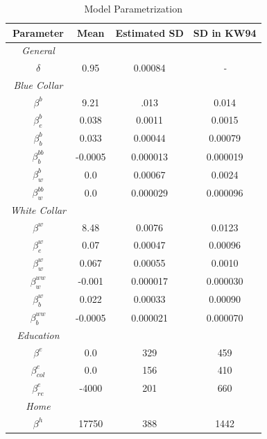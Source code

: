 \setlength{\tabcolsep}{18pt} %
\begin{table}[H] 
	\centering
	\begin{threeparttable}
		\caption[Model Parametrization]{Model Parametrization}
		\label{tab:params}
		\renewcommand{\arraystretch}{1.2}%
		\begin{tabular}{cS[table-format=3.2]S[table-format=3.2]S[table-format=3.2]}
			\toprule
			{Parameter}     & {Mean}   & {Estimated SD} & {SD in KW94} \\ \midrule
			\textit{General} \\
			$\delta$ & 0.95   & 0.00084 & \textit{-}	\\	\midrule
			\textit{Blue Collar}\\	
			$\beta^b$ & 9.21   & .013            & 0.014      \\
			$\beta_e^b$ & 0.038  &    0.0011        & 0.0015       \\
			$\beta_b^b$ & 0.033  & 0.00044            & 0.00079       \\
			$\beta_b^{bb}$ & -0.0005 & 0.000013           & 0.000019       \\
			$\beta_w^b$ & 0.0    & 0.00067             & 0.0024      \\
			$\beta_w^{bb}$ & 0.0    & 0.000029           & 0.000096       \\ \midrule
			\textit{White Collar}\\
			$\beta^w$ & 8.48   & 0.0076             & 0.0123      \\
			$\beta_e^w$ & 0.07   & 0.00047          & 0.00096       \\
			$\beta_w^w$ & 0.067  & 0.00055            & 0.0010      \\
			$\beta_w^{ww}$ & -0.001  & 0.000017           & 0.000030      \\
			$\beta_b^w$ & 0.022  & 0.00033           & 0.00090      \\
			$\beta_b^{ww}$ & -0.0005 & 0.000021         & 0.000070      \\ \midrule
			\textit{Education} \\
			$\beta^e$     & 0.0    & 329                & 459       \\
			$\beta_{col}^e$     & 0.0    & 156               & 410       \\
			$\beta_{re}^e$     & -4000   & 201                & 660       \\ \midrule
			\textit{Home} \\
			$\beta^h$    & 17750  & 388                & 1442      \\ \midrule

\end{tabular}
\end{threeparttable}
\end{table}
